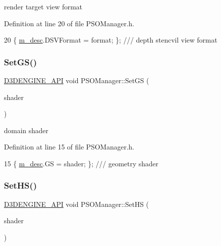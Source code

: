 render target view format 



Definition at line 20 of file P\+S\+O\+Manager.\+h.


\begin{DoxyCode}
20 \{ \mbox{\hyperlink{class_p_s_o_manager_ac5a7e346b2d641709d7146f5a0f45dee}{m\_desc}}.DSVFormat = format; \}; \textcolor{comment}{/// depth stencvil view format}
\end{DoxyCode}
\mbox{\label{class_p_s_o_manager_afe604c8d31fd10721f04b6deab4b0bf0}} 
\subsubsection{\texorpdfstring{Set\+G\+S()}{SetGS()}}
{\footnotesize\ttfamily \mbox{\hyperlink{stdafx_8h_a8ee2d990c5dfba7794dd2b60741d7722}{D3\+D\+E\+N\+G\+I\+N\+E\+\_\+\+A\+PI}} void P\+S\+O\+Manager\+::\+Set\+GS (\begin{DoxyParamCaption}\item[{const C\+D3\+D\+X12\+\_\+\+S\+H\+A\+D\+E\+R\+\_\+\+B\+Y\+T\+E\+C\+O\+DE}]{shader }\end{DoxyParamCaption})\hspace{0.3cm}{\ttfamily [inline]}}



domain shader 



Definition at line 15 of file P\+S\+O\+Manager.\+h.


\begin{DoxyCode}
15 \{ \mbox{\hyperlink{class_p_s_o_manager_ac5a7e346b2d641709d7146f5a0f45dee}{m\_desc}}.GS = shader; \}; \textcolor{comment}{/// geometry shader}
\end{DoxyCode}
\mbox{\label{class_p_s_o_manager_ae47d5393d8b85d30e300505703664922}} 
\subsubsection{\texorpdfstring{Set\+H\+S()}{SetHS()}}
{\footnotesize\ttfamily \mbox{\hyperlink{stdafx_8h_a8ee2d990c5dfba7794dd2b60741d7722}{D3\+D\+E\+N\+G\+I\+N\+E\+\_\+\+A\+PI}} void P\+S\+O\+Manager\+::\+Set\+HS (\begin{DoxyParamCaption}\item[{const C\+D3\+D\+X12\+\_\+\+S\+H\+A\+D\+E\+R\+\_\+\+B\+Y\+T\+E\+C\+O\+DE}]{shader }\end{DoxyParamCaption})\hspace{0.3cm}{\ttfamily [inline]}}



